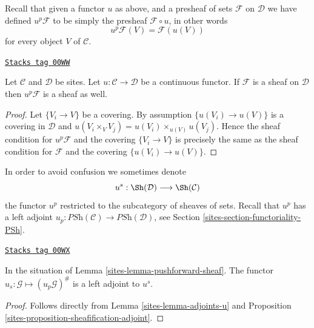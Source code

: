 Recall that given a functor $u$ as above, and a presheaf of sets
$\mathcal{F}$ on $\mathcal{D}$ we have defined
$u^p\mathcal{F}$ to be simply the presheaf
$\mathcal{F} \circ u$, in other words
$$
u^p\mathcal{F} (V) = \mathcal{F}(u(V))
$$
for every object $V$ of $\mathcal{C}$.

\begin{lemma}
\label{sites-lemma-pushforward-sheaf}
\href{https://stacks.math.columbia.edu/tag/00WW}{\texttt{Stacks tag 00WW}}

Let $\mathcal{C}$ and $\mathcal{D}$ be sites.
Let $u : \mathcal{C} \to \mathcal{D}$ be a continuous functor.
If $\mathcal{F}$ is a sheaf on $\mathcal{D}$ then
$u^p\mathcal{F}$ is a sheaf as well.
\end{lemma}

\begin{proof}
Let $\{V_i \to V\}$ be a covering.
By assumption $\{u(V_i) \to u(V)\}$ is a covering
in $\mathcal{D}$ and $u(V_i \times_V V_j) =
u(V_i)\times_{u(V)}u(V_j)$. Hence the sheaf condition for
$u^p\mathcal{F}$ and the covering $\{V_i \to V\}$
is precisely the same as the sheaf condition for $\mathcal{F}$
and the covering $\{u(V_i) \to u(V)\}$.
\end{proof}

In order to avoid confusion we sometimes denote
$$
u^s :
\Sh(\mathcal{D})
\longrightarrow
\Sh(\mathcal{C})
$$
the functor $u^p$ restricted to the subcategory of sheaves of sets.
Recall that $u^p$ has a left adjoint
$u_p : \textit{PSh}(\mathcal{C}) \to \textit{PSh}(\mathcal{D})$, see
Section \ref{sites-section-functoriality-PSh}.

\begin{lemma}
\label{sites-lemma-adjoint-sheaves}
\href{https://stacks.math.columbia.edu/tag/00WX}{\texttt{Stacks tag 00WX}}

In the situation of Lemma \ref{sites-lemma-pushforward-sheaf}.
The functor $u_s : \mathcal{G} \mapsto (u_p \mathcal{G})^\#$
is a left adjoint to $u^s$.
\end{lemma}

\begin{proof}

Follows directly from Lemma \ref{sites-lemma-adjoints-u} and
Proposition \ref{sites-proposition-sheafification-adjoint}.
\end{proof}

